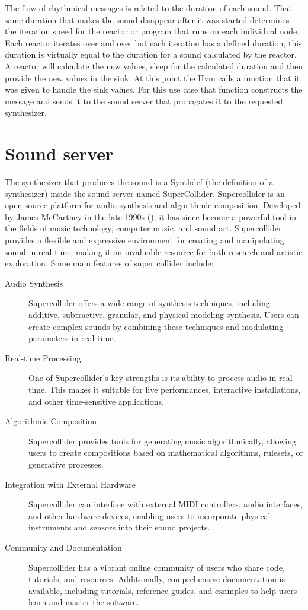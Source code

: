 \documentclass[a4paper]{book}
\begin{document}
The flow of rhythmical messages is related to the duration of each sound. That same duration that makes the sound disappear after it was started determines the iteration speed for the reactor or program that runs on each individual node. Each reactor iterates over and over but each iteration has a defined duration, this duration is virtually equal to the duration for a sound calculated by the reactor. A reactor will calculate the new values, sleep for the calculated duration and then provide the new values in the sink. At this point the Hvm calls a function that it was given to handle the sink values. For this use case that function constructs the message and sends it to the sound server that propagates it to the requested synthesizer. 

\section{Sound server}
The synthesizer that produces the sound is a Synthdef (the definition of a synthesizer) inside the sound server named SuperCollider. Supercollider is an open-source platform for audio synthesis and algorithmic composition. Developed by James McCartney in the late 1990s (\cite{scBook}), it has since become a powerful tool in the fields of music technology, computer music, and sound art. Supercollider provides a flexible and expressive environment for creating and manipulating sound in real-time, making it an invaluable resource for both research and artistic exploration. Some main features of super collider include:

\begin{description}
	\item[Audio Synthesis] Supercollider offers a wide range of synthesis techniques, including additive, subtractive, granular, and physical modeling synthesis. Users can create complex sounds by combining these techniques and modulating parameters in real-time.
	\item[Real-time Processing] One of Supercollider's key strengths is its ability to process audio in real-time. This makes it suitable for live performances, interactive installations, and other time-sensitive applications.
	\item[Algorithmic Composition] Supercollider provides tools for generating music algorithmically, allowing users to create compositions based on mathematical algorithms, rulesets, or generative processes.
	\item[Integration with External Hardware] Supercollider can interface with external MIDI controllers, audio interfaces, and other hardware devices, enabling users to incorporate physical instruments and sensors into their sound projects.
	\item[Community and Documentation] Supercollider has a vibrant online community of users who share code, tutorials, and resources. Additionally, comprehensive documentation is available, including tutorials, reference guides, and examples to help users learn and master the software.
	
	
\end{description}
\end{document}
